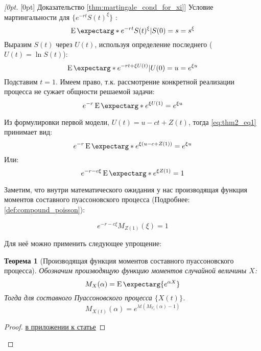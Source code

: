 \documentclass[a4paper,12pt]{article}
\newtheorem{theorem}{Теорема}
\theoremstyle{definition}
\newenvironment{delayedproof}[1]
 {\begin{proof}[\raisedtarget{#1}Доказательство \autoref{#1}]}
 {\end{proof}}
\newcommand{\raisedtarget}[1]{%
  \raisebox{\fontcharht\font`P}[0pt][0pt]{\hypertarget{#1}{}}%
}
\newcommand{\proofref}[1]{\hyperlink{#1}{в приложении к статье}}
\newcommand{\expect}{\operatorname{E}\expectarg}
\begin{document}
\begin{delayedproof}{thm:martingale_cond_for_xi} 
Условие мартингальности для $\{e^{-rt} S(t)^{\xi}\}$ :
\begin{equation*}
\expect*{e^{-rt} S(t)^{\xi}|S(0) = s} = s^{\xi}
\end{equation*}
Выразим $S(t)$ через $U(t)$, используя определение последнего ($U(t) = \ln{S(t)}$):
\begin{equation*}
\expect*{e^{-rt + \xi U(t)}|U(0) = u} = e^{\xi u}
\end{equation*}
Подставим $t = 1$. Имеем право, т.к. рассмотрение конкретной реализации процесса не сужает общности решаемой задачи:
\begin{equation}\label{eq:thm2_eq1}
e^{-r}\expect*{e^{\xi U(1)}} = e^{\xi u}
\end{equation}

Из формулировки первой модели, $U(t) = u - ct + Z(t)$, тогда \eqref{eq:thm2_eq1} принимает вид:
\begin{equation*}
e^{-r}\expect*{e^{\xi(u - c + Z(1))}} = e^{\xi u}
\end{equation*}
Или:
\begin{equation*}
e^{-r - c \xi} \expect*{e^{\xi Z(1)}} = 1
\end{equation*}

Заметим, что внутри математического ожидания у нас производящая функция моментов составного пуассоновского процесса (Подробнее: \autoref{def:compound_poisson}):

\begin{equation}\label{eq:thm2_eq2}
e^{-r - c \xi} M_{Z(1)}(\xi) = 1
\end{equation}

Для неё можно применить следующее упрощение:

\begin{theorem}[Производящая функция моментов составного пуассоновского процесса]\label{thm:thm2_moment_generating_function}
Обозначим производящую функцию моментов случайной величины $X$:
\begin{equation*}
    M_X(\alpha) = \expect{e^{\alpha X}}
\end{equation*}
Тогда для составного Пуассоновского процесса $\{X(t)\}$.
\begin{equation}\label{eq:moment_generating_for_poisson}
     M_{X(t)}(\alpha) = e^{\lambda t \left(M_{Y_1}(\alpha) - 1\right)}
\end{equation}
\end{theorem}
\begin{proof}
\proofref{thm:thm2_moment_generating_function}
\end{proof}


\end{delayedproof}
\end{document}
